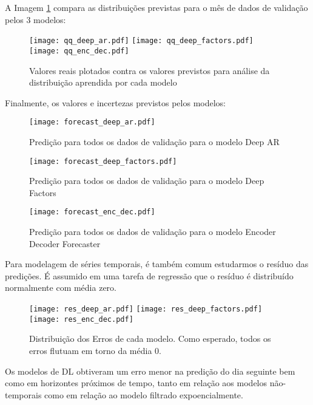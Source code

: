 A Imagem \ref{fig:distr} compara as distribuições previstas para o mês
de dados de validação pelos 3 modelos:

\begin{figure}[H]
\centering
\texttt{[image: qq\_deep\_ar.pdf]} \hfill
\texttt{[image: qq\_deep\_factors.pdf]} \hfill
\texttt{[image: qq\_enc\_dec.pdf]} 
\caption{Valores reais plotados contra os valores previstos para análise da distribuição aprendida por cada modelo} 
\label{fig:distr}
\end{figure}


Finalmente, os valores e incertezas previstos pelos modelos:


\begin{figure}[H]
  \label{fig:fordeepar}
  \centering
\texttt{[image: forecast\_deep\_ar.pdf]} 
\caption{Predição para todos os dados de validação para o modelo Deep AR}
\end{figure}

\begin{figure}[H]
  \label{fig:fordeepfactors}
  \centering
\texttt{[image: forecast\_deep\_factors.pdf]} 
\caption{Predição para todos os dados de validação para o modelo Deep Factors}
\end{figure}

\begin{figure}[H]
  \label{fig:forencdec}
  \centering
\texttt{[image: forecast\_enc\_dec.pdf]} 
\caption{Predição para todos os dados de validação para o modelo Encoder Decoder Forecaster} 
\end{figure}


Para modelagem de séries temporais, é também comum estudarmos o resíduo das
predições. É assumido em uma tarefa de regressão que o resíduo é distribuído
normalmente com média zero.


\begin{figure}[H]
\label{fig:res}
\centering
\texttt{[image: res\_deep\_ar.pdf]} \hfill
\texttt{[image: res\_deep\_factors.pdf]} \hfill
\texttt{[image: res\_enc\_dec.pdf]} 
\caption{Distribuição dos Erros de cada modelo. Como esperado, todos os erros flutuam em torno da média 0. } 
\end{figure}







Os modelos de DL obtiveram um erro menor na predição do dia seguinte bem como em
horizontes próximos de tempo, tanto em relação aos modelos não-temporais como em
relação ao modelo filtrado expoencialmente.

